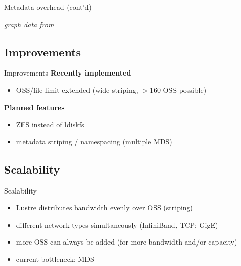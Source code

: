 \begin{frame}{Metadata overhead (cont'd)}
{
    }

    \vspace{1cm}
    \hfill{\scriptsize\emph{graph data from \cite{metadata-scaling}}}
\end{frame}

\subsection{Improvements}
\begin{frame}{Improvements}
    \textbf{Recently implemented}
    \begin{itemize}
        \item OSS/file limit extended (wide striping, $> 160$ OSS possible)
    \end{itemize}

    \textbf{Planned features}
    \begin{itemize}
        \item ZFS instead of ldiskfs
        \item metadata striping / namespacing (multiple MDS)
    \end{itemize}
\end{frame}

\subsection{Scalability}
\begin{frame}{Scalability}
    \begin{itemize}
        \item Lustre distributes bandwidth evenly over OSS (striping)
        \item different network types simultaneously (InfiniBand, TCP: GigE)
        \item more OSS can always be added (for more bandwidth and/or capacity)
        \item current bottleneck: MDS
    \end{itemize}
\end{frame}

